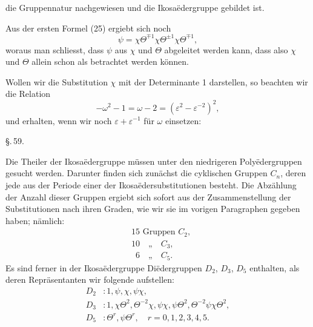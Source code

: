 die Gruppennatur nachgewiesen und die Ikosa\"edergruppe gebildet ist.

Aus der ersten Formel (25) ergiebt sich noch
\[
\psi = \chi\Theta^{\mp1}\chi\Theta^{\pm1}\chi\Theta^{\mp1},
\]
woraus man schliesst, dass $\psi$ aus $\chi$ und $\Theta$ abgeleitet werden kann, dass also $\chi$ und $\Theta$ allein schon als  betrachtet werden können.

Wollen wir die Substitution $\chi$ mit der Determinante 1 darstellen, so beachten wir die Relation
\[
-\omega^2-1 = \omega-2 = (\varepsilon^2-\varepsilon^{-2})^2,
\]
und erhalten, wenn wir noch $\varepsilon+\varepsilon^{-1}$ für $\omega$ einsetzen:

\S.\,59.


Die Theiler der Ikosa\"edergruppe müssen unter den niedrigeren Poly\"edergruppen gesucht werden. Darunter finden sich zunächst die cyklischen Gruppen $C_n$, deren jede aus der Periode einer der Ikosa\"edersubstitutionen besteht. Die Abzählung der Anzahl dieser Gruppen ergiebt sich sofort aus der Zusammenstellung der Substitutionen nach ihren Graden, wie wir sie im vorigen Paragraphen gegeben haben; nämlich:
\[
\begin{aligned}
&15 \text{ Gruppen } C_2, \\
&10 \quad \text{„} \quad C_3, \\
&\phantom{0}6 \quad \text{„} \quad C_5.
\end{aligned}
\]
Es sind ferner in der Ikosa\"edergruppe Di\"edergruppen $D_2$, $D_3$, $D_5$ enthalten, als deren Repräsentanten wir folgende aufstellen:
\[
\begin{aligned}
D_2 &: 1, \psi, \chi, \psi\chi, \\
D_3 &: 1, \chi\Theta^2, \Theta^{-2}\chi, \psi\chi, \psi\Theta^2, \Theta^{-2}\psi\chi\Theta^2, \\
D_5 &: \Theta^r, \psi\Theta^r, \quad r=0,1,2,3,4,5.
\end{aligned}
\]
